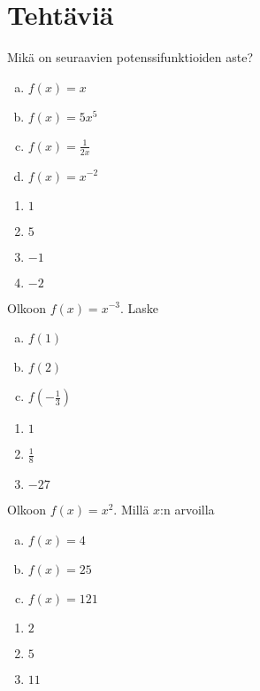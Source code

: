 


\section*{Tehtäviä}

\begin{tehtava}
Mikä on seuraavien potenssifunktioiden aste?
\begin{enumerate}[a)]
\item $f(x) = x$
\item $f(x) = 5x^5$
\item $f(x) = \frac{1}{2x}$
\item $f(x) = x^{-2}$
\end{enumerate}
\begin{vastaus}
\begin{enumerate}
\item $1$
\item $5$
\item $-1$
\item $-2$
\end{enumerate}
\end{vastaus}
\end{tehtava}
\begin{tehtava}
Olkoon $f(x)=x^{-3}$. Laske
\begin{enumerate}[a)]
\item $f(1)$
\item $f(2)$
\item $f(-\frac{1}{3})$
\end{enumerate}
\begin{vastaus}
\begin{enumerate}
\item $1$
\item $\frac{1}{8}$
\item $-27$
\end{enumerate}
\end{vastaus}
\end{tehtava}
\begin{tehtava}
Olkoon $f(x)=x^2$. Millä $x$:n arvoilla
\begin{enumerate}[a)]
\item $f(x)=4$
\item $f(x)=25$
\item $f(x)=121$
\end{enumerate}
\begin{vastaus}
\begin{enumerate}
\item $2$
\item $5$
\item $11$
\end{enumerate}
\end{vastaus}
\end{tehtava}
